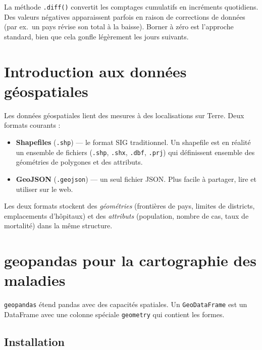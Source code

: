 \begin{clinicalnote}
La m\'ethode \texttt{.diff()} convertit les comptages cumulatifs en incr\'ements quotidiens. Des valeurs n\'egatives apparaissent parfois en raison de corrections de donn\'ees (par ex.\ un pays r\'evise son total \`a la baisse). Borner \`a z\'ero est l'approche standard, bien que cela gonfle l\'eg\`erement les jours suivants.
\end{clinicalnote}

\section{Introduction aux donn\'ees g\'eospatiales}

Les donn\'ees g\'eospatiales lient des mesures \`a des localisations sur Terre. Deux formats courants :

\begin{itemize}
  \item \textbf{Shapefiles} (\texttt{.shp}) --- le format SIG traditionnel. Un shapefile est en r\'ealit\'e un ensemble de fichiers (\texttt{.shp}, \texttt{.shx}, \texttt{.dbf}, \texttt{.prj}) qui d\'efinissent ensemble des g\'eom\'etries de polygones et des attributs.
  \item \textbf{GeoJSON} (\texttt{.geojson}) --- un seul fichier JSON. Plus facile \`a partager, lire et utiliser sur le web.
\end{itemize}

Les deux formats stockent des \emph{g\'eom\'etries} (fronti\`eres de pays, limites de districts, emplacements d'h\^opitaux) et des \emph{attributs} (population, nombre de cas, taux de mortalit\'e) dans la m\^eme structure.

\section{geopandas pour la cartographie des maladies}

\texttt{geopandas} \'etend pandas avec des capacit\'es spatiales. Un \texttt{GeoDataFrame} est un DataFrame avec une colonne sp\'eciale \texttt{geometry} qui contient les formes.

\subsection{Installation}

